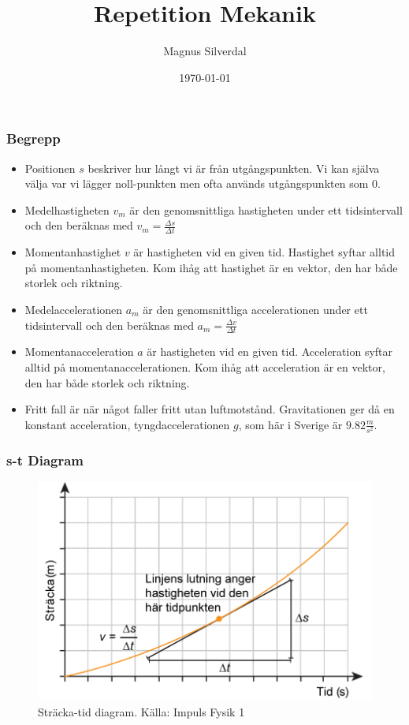 \documentclass[11pt]{beamer}
\title{Repetition Mekanik}
\author{Magnus Silverdal}
\institute{NTI Gymnasiet}
\date{\today}
\begin{document}
    \frame{\titlepage}

    \begin{frame}
        \frametitle{Begrepp}
        \begin{itemize}
            \item Positionen $s$ beskriver hur långt vi är från utgångspunkten. Vi kan själva välja var vi lägger noll-punkten
            men ofta används utgångspunkten som 0.
            \item Medelhastigheten $v_m$ är den genomsnittliga hastigheten under ett tidsintervall och den beräknas med
            $v_m=\frac{\Delta s}{\Delta t}$
            \item Momentanhastighet $v$ är hastigheten vid en given tid. Hastighet syftar alltid på momentanhastigheten.
            Kom ihåg att hastighet är en vektor, den har både storlek och riktning.
            \item Medelaccelerationen $a_m$ är den genomsnittliga accelerationen under ett tidsintervall och den beräknas med
            $a_m=\frac{\Delta v}{\Delta t}$
            \item Momentanacceleration $a$ är hastigheten vid en given tid. Acceleration syftar alltid på momentanaccelerationen.
            Kom ihåg att acceleration är en vektor, den har både storlek och riktning.
            \item Fritt fall är när något faller fritt utan luftmotstånd. Gravitationen ger då en konstant acceleration,
            tyngdaccelerationen $g$, som här i Sverige är $9.82 \frac{m}{s^2}$.
        \end{itemize}
    \end{frame}
    \begin{frame}
        \frametitle{s-t Diagram}
        \begin{figure}[!h]
            \includegraphics[width=\textwidth]{../images/chapter3/DistTime}
            \caption{Sträcka-tid diagram. Källa: Impuls Fysik 1}
        \end{figure}
    \end{frame}
\end{document}
